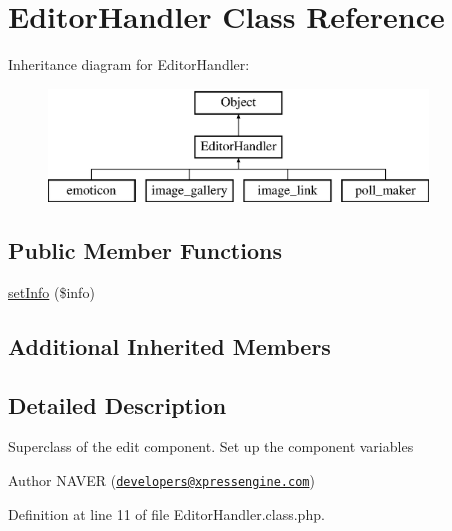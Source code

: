 \hypertarget{classEditorHandler}{\section{Editor\+Handler Class Reference}
\label{classEditorHandler}
}
Inheritance diagram for Editor\+Handler\+:\begin{figure}[H]
\begin{center}
\leavevmode
\includegraphics[height=3.000000cm]{classEditorHandler}
\end{center}
\end{figure}
\subsection*{Public Member Functions}
\begin{DoxyCompactItemize}
\item 
\hyperlink{classEditorHandler_af44daebb94e0ce9ca6ff5a792fb52023}{set\+Info} (\$info)
\end{DoxyCompactItemize}
\subsection*{Additional Inherited Members}


\subsection{Detailed Description}
Superclass of the edit component. Set up the component variables

\begin{DoxyAuthor}{Author}
N\+A\+V\+E\+R (\href{mailto:developers@xpressengine.com}{\tt developers@xpressengine.\+com}) 
\end{DoxyAuthor}


Definition at line 11 of file Editor\+Handler.\+class.\+php.



